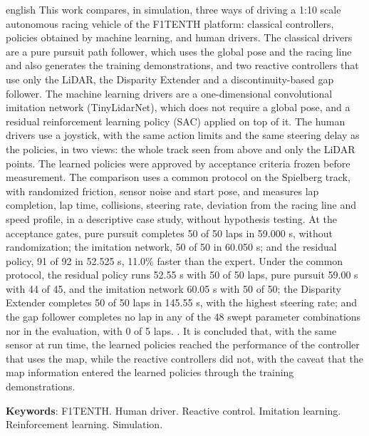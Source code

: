 \begin{resumo}[Abstract]
 \begin{otherlanguage*}{english}
   This work compares, in simulation, three ways of driving a 1:10 scale
   autonomous racing vehicle of the F1TENTH platform: classical controllers,
   policies obtained by machine learning, and human drivers. The classical
   drivers are a pure pursuit path follower, which uses the global pose and
   the racing line and also generates the training demonstrations, and two
   reactive controllers that use only the LiDAR, the Disparity Extender and a
   discontinuity-based gap follower. The machine learning drivers are a
   one-dimensional convolutional imitation network (TinyLidarNet), which
   does not require a global pose, and a residual reinforcement learning
   policy (SAC) applied on top of it. The human drivers use a joystick, with
   the same action limits and the same steering delay as the policies, in
   two views: the whole track seen from above and only the LiDAR points. The
   learned policies were approved by acceptance criteria frozen before
   measurement. The comparison uses a common protocol on the Spielberg
   track, with randomized friction, sensor noise and start pose, and
   measures lap completion, lap time, collisions, steering rate, deviation
   from the racing line and speed profile, in a descriptive case study,
   without hypothesis testing. At the acceptance gates, pure pursuit
   completes 50 of 50 laps in 59.000 s, without randomization; the imitation
   network, 50 of 50 in 60.050 s; and the residual policy, 91 of 92 in
   52.525 s, 11.0\% faster than the expert. Under the common protocol, the
   residual policy runs 52.55 s with 50 of 50 laps, pure pursuit 59.00 s with
   44 of 45, and the imitation network 60.05 s with 50 of 50; the Disparity
   Extender completes 50 of 50 laps in 145.55 s, with the highest steering
   rate; and the gap follower completes no lap in any of the 48 swept
   parameter combinations nor in the evaluation, with 0 of 5 laps.
   .
   It is concluded that, with the same sensor at run time, the learned
   policies reached the performance of the controller that uses the map,
   while the reactive controllers did not, with the caveat that the map
   information entered the learned policies through the training
   demonstrations.

   \vspace{\onelineskip}

   \noindent
   \textbf{Keywords}: F1TENTH. Human driver. Reactive control. Imitation
   learning. Reinforcement learning. Simulation.
 \end{otherlanguage*}
\end{resumo}
